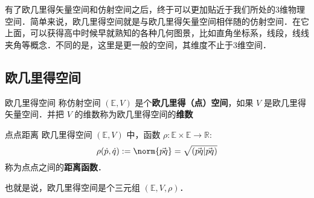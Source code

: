 有了欧几里得矢量空间和仿射空间之后，终于可以更加贴近于我们所处的3维物理空间．简单来说，欧几里得空间就是与欧几里得矢量空间相伴随的仿射空间．在它上面，可以获得高中时候早就熟知的各种几何图景，比如直角坐标系，线段，线线夹角等概念．不同的是，这里是更一般的空间，其维度不止于3维空间．
\subsection{欧几里得空间}
\begin{definition}{欧几里得空间}
称仿射空间 $(\mathbb E,V)$ 是个\textbf{欧几里得（点）空间}，如果 $V$ 是欧几里得矢量空间．并把 $V$ 的维数称为欧几里得空间的\textbf{维数}
\end{definition}
\begin{definition}{点点距离}
欧几里得空间 $(\mathbb E,V)$ 中，函数 $\rho:\mathbb E\times\mathbb E\rightarrow\mathbb R$:
\begin{equation}
\rho(\dot p,\dot q):=\norm{\vec{pq}}=\sqrt{(\vec{pq}|\vec{pq})}
\end{equation}
称为点点之间的\textbf{距离函数}．
\end{definition}
也就是说，欧几里得空间是个三元组 $(\mathbb E,V,\rho)$．

